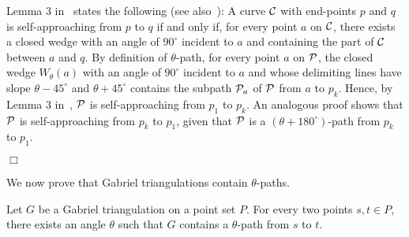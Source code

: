\documentclass{llncs}
\newcommand{\remove}[1]{}
\renewenvironment{proof}
{{\bf Proof:}}{\hspace*{\fill}$\Box$\par\vspace{2mm}}
\begin{document}
\begin{proof}
Lemma 3 in~\cite{ikl-sac-99} states the following (see also~\cite{aaiklr-gsac-01}): A curve $\cal C$ with end-points $p$ and $q$ is self-approaching from $p$ to $q$ if and only if, for every point $a$ on $\cal C$, there exists a closed wedge with an angle of $90^\circ$ incident to $a$ and containing the part of $\cal C$ between $a$ and $q$.
By definition of $\theta$-path, for every point $a$ on $\cal P$, the closed wedge $W_\theta(a)$ with an angle of $90^\circ$ incident to $a$ and whose delimiting lines have slope $\theta-45^\circ$ and $\theta+45^\circ$ contains the subpath ${\cal P}_a$ of $\cal P$ from $a$ to $p_k$. Hence, by Lemma 3 in~\cite{ikl-sac-99}, $\cal P$ is self-approaching from $p_1$ to $p_k$.
An analogous proof shows that $\cal P$ is self-approaching from $p_k$ to $p_1$, given that $\cal P$ is a $(\theta+180^{\circ})$-path from $p_k$ to $p_1$.
\remove{We prove that $\cal P$ is self-approaching from $p_1$ to $p_k$. The proof that $\cal P$ is self-approaching from $p_k$ to $p_1$ is analogous, as $\cal P$ is a $(\theta+180^{\circ})$-path from $p_k$ to $p_1$.

Consider any three points $a$, $b$, and $c$ on $\cal P$ in this order from $p_1$ to $p_k$. Assume that $a$, $b$, and $c$ appear in this counter-clockwise order along triangle $(a,b,c)$, the case in which they appear in clockwise order $a$, $b$, and $c$ is analogous. In order to prove that $|\overline{ac}|>|\overline{bc}|$ it suffices to prove that $\angle{abc}\geq 90^\circ$. Since $c$ is in $W_{\theta}(b)$ and since $b$ is in $W_{\theta}(a)$, we have that $\angle{abc}\geq \angle{abc'}$, where $c'$ is the intersection point of $\overline{ac}$ with the line delimiting $W_{\theta}(b)$ with slope $\theta+45^\circ$. Moreover, $\angle{abc'}\geq 90^\circ$, given that $\angle{abc'}$ is the supplementary  of the angle obtained by counter-clockwise rotating $\overline{ab}$ until it coincides with the line delimiting $W_{\theta}(a)$ with slope $\theta+45^\circ$. The latter angle is smaller than or equal to $90^\circ$, given that it is not larger than the angle of wedge $W_{\theta}(a)$. This proves that $\cal P$ is self-approaching from $p_1$ to $p_k$, and hence it proves the lemma.
}
\end{proof}

\remove{
}
We now prove that Gabriel triangulations contain $\theta$-paths.

\begin{lemma} \label{le:gabriel-is-theta}
Let $G$ be a Gabriel triangulation on a point set $P$. For every two points $s,t\in P$, there exists an angle $\theta$ such that $G$ contains a $\theta$-path from $s$ to $t$.
\end{lemma}
\end{document}
